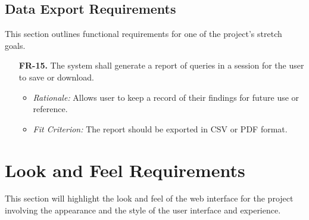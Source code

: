 \documentclass[12pt]{article}
\begin{document}
\subsection{Data Export Requirements}
This section outlines functional requirements for one of the project's stretch
goals.
\begin{enumerate}
  \item[\textbf{FR-15.}] The system shall generate a report of queries in a
  session for the user to save or download.
  \begin{itemize}
    \item \textit{Rationale:} Allows user to keep a record of their findings for
    future use or reference.
    \item \textit{Fit Criterion:} The report should be exported in CSV or PDF
    format.
  \end{itemize}
\end{enumerate}

\section{Look and Feel Requirements}
This section will highlight the look and feel of the web interface for the
project involving the appearance and the style of the user interface and
experience.
\end{document}
